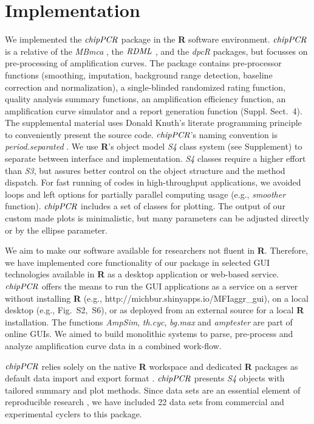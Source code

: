 \documentclass{bioinfo}
\begin{document}
\section{Implementation}
\begin{methods}
We implemented the $\emph{chipPCR}$ package in the \textbf{R} software 
environment. $\emph{chipPCR}$ is a relative of the \emph{MBmca} 
\citep{roediger_RJ_2013}, the $\emph{RDML}$ \citep{blagodatskikh_2014}, and the 
\emph{dpcR} \citep{pabinger_2014} packages, but focusses on pre-processing of 
amplification curves. The package contains pre-processor functions (smoothing, 
imputation, background range detection, baseline correction and normalization), 
a single-blinded randomized rating function, quality analysis summary functions, 
an amplification efficiency function, an amplification curve simulator
and a report generation function (Suppl. Sect.~4). The supplemental material 
uses Donald Knuth's literate programming principle~\citep{Knuth1984} to 
conveniently present the source code. $\emph{chipPCR}$'s naming convention is 
\textit{period.separated} \citep{Baaaath_2012}. We use \textbf{R}'s object model 
\emph{S4} class system (see Supplement) to separate between interface and 
implementation. \emph{S4} classes require a higher effort than \emph{S3}, but 
assures better control on the object structure and the method dispatch. For fast 
running of codes in high-throughput applications, we avoided loops and left 
options for partially parallel computing usage (e.g., \textsl{smoother} 
function). $\emph{chipPCR}$ includes a set of classes for plotting. The output 
of our custom made plots is minimalistic, but many parameters can be adjusted 
directly or by the ellipse parameter.

We aim to make our software available for researchers not fluent in 
\textbf{R}. Therefore, we have implemented core functionality of our package in 
selected GUI technologies available in \textbf{R} \citep{rodiger_rkward_2012} as a
desktop application or web-based service. $\emph{chipPCR}$ offers the means to run 
the GUI applications as a service on a server without installing \textbf{R} (e.g., 
http://michbur.shinyapps.io/MFIaggr\_gui), on a local 
desktop (e.g., Fig.~S2,~S6), or as deployed from an external %
source for a local \textbf{R} installation. The functions \textsl{AmpSim}, 
\textsl{th.cyc}, \textsl{bg.max} and \textsl{amptester} are part of online GUIs. 
We aimed to build monolithic systems to parse, pre-process and analyze 
amplification curve data in a combined work-flow. 

$\emph{chipPCR}$ relies solely on the native \textbf{R} 
workspace and dedicated \textbf{R} packages as default data import 
and export format \citep{perkins_2012,rodiger_rkward_2012,blagodatskikh_2014}. 
$\emph{chipPCR}$ presents \emph{S4} objects with tailored summary and plot 
methods. Since data sets are an essential element of reproducible research 
\citep{Leeper_2014}, we have included 22 data sets from commercial and 
experimental cyclers to this package.
\end{methods}
\end{document}
